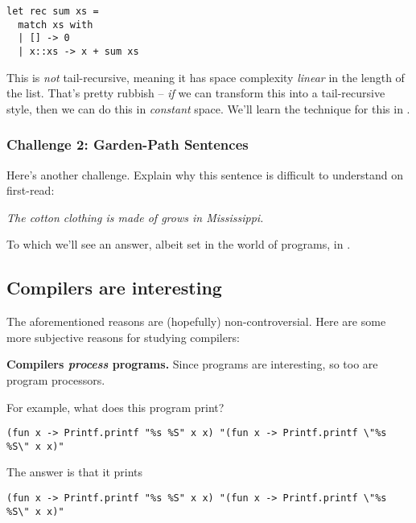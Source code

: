 \begin{code}
\label{code:cps-challenge}
\begin{verbatim}
let rec sum xs = 
  match xs with
  | [] -> 0
  | x::xs -> x + sum xs
\end{verbatim}
\end{code}

This is \emph{not} tail-recursive, meaning it has space complexity \emph{linear} in the length of the list. That's pretty rubbish -- \emph{if} we can transform this into a tail-recursive style, then we can do this in \emph{constant} space. We'll learn the technique for this in .

\subsubsection{Challenge 2: Garden-Path Sentences}
Here's another challenge. Explain why this sentence is difficult to understand on first-read:

\begin{center}
    \textit{The cotton clothing is made of grows in Mississippi.}
\end{center}

To which we'll see an answer, albeit set in the world of programs, in .

\subsection{Compilers are interesting}
The aforementioned reasons are (hopefully) non-controversial. Here are some more subjective reasons for studying compilers:

\textbf{Compilers \emph{process} programs.} Since programs are interesting, so too are program processors.

For example, what does this program \cite{drup-2018} print?

\begin{code}
\begin{verbatim}
(fun x -> Printf.printf "%s %S" x x) "(fun x -> Printf.printf \"%s %S\" x x)"
\end{verbatim}
\end{code}

The answer is that it prints 

{
\verb|(fun x -> Printf.printf "%s %S" x x) "(fun x -> Printf.printf \"%s %S\" x x)"|
}

